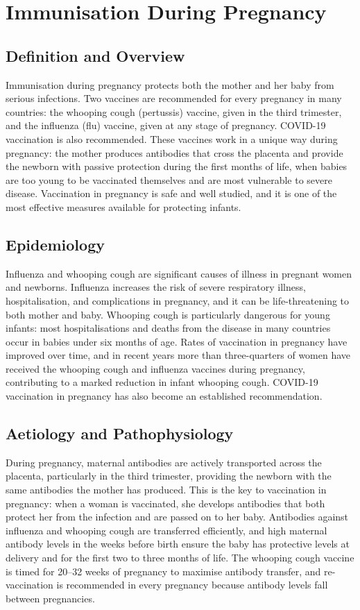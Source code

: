 \chapter{Immunisation During Pregnancy}

\section*{Definition and Overview}
Immunisation during pregnancy protects both the mother and her baby from serious infections. Two vaccines are recommended for every pregnancy in many countries: the whooping cough (pertussis) vaccine, given in the third trimester, and the influenza (flu) vaccine, given at any stage of pregnancy. COVID-19 vaccination is also recommended. These vaccines work in a unique way during pregnancy: the mother produces antibodies that cross the placenta and provide the newborn with passive protection during the first months of life, when babies are too young to be vaccinated themselves and are most vulnerable to severe disease. Vaccination in pregnancy is safe and well studied, and it is one of the most effective measures available for protecting infants.

\section*{Epidemiology}
Influenza and whooping cough are significant causes of illness in pregnant women and newborns. Influenza increases the risk of severe respiratory illness, hospitalisation, and complications in pregnancy, and it can be life-threatening to both mother and baby. Whooping cough is particularly dangerous for young infants: most hospitalisations and deaths from the disease in many countries occur in babies under six months of age. Rates of vaccination in pregnancy have improved over time, and in recent years more than three-quarters of women have received the whooping cough and influenza vaccines during pregnancy, contributing to a marked reduction in infant whooping cough. COVID-19 vaccination in pregnancy has also become an established recommendation.

\section*{Aetiology and Pathophysiology}
During pregnancy, maternal antibodies are actively transported across the placenta, particularly in the third trimester, providing the newborn with the same antibodies the mother has produced. This is the key to vaccination in pregnancy: when a woman is vaccinated, she develops antibodies that both protect her from the infection and are passed on to her baby. Antibodies against influenza and whooping cough are transferred efficiently, and high maternal antibody levels in the weeks before birth ensure the baby has protective levels at delivery and for the first two to three months of life. The whooping cough vaccine is timed for 20--32 weeks of pregnancy to maximise antibody transfer, and re-vaccination is recommended in every pregnancy because antibody levels fall between pregnancies.

